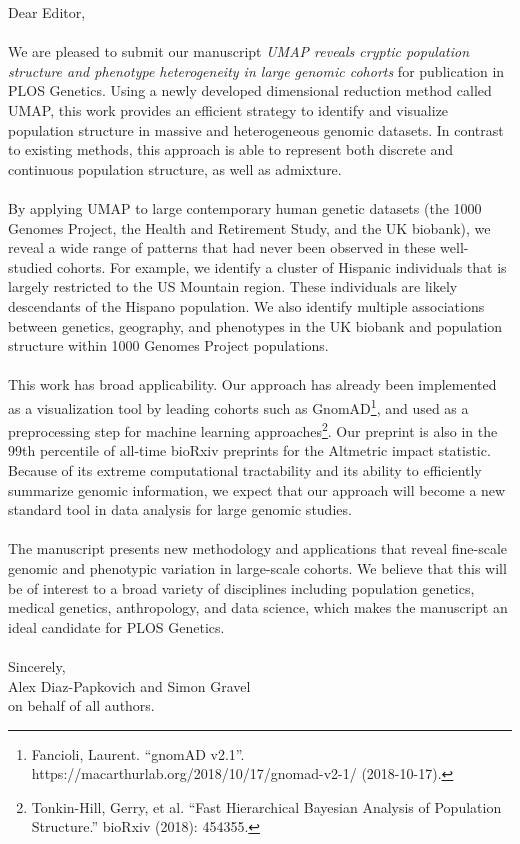 \documentclass{article}
\begin{document}
Dear Editor,
\\\\
We are pleased to submit our manuscript \emph{UMAP reveals cryptic population structure and phenotype heterogeneity in large genomic cohorts} for publication in PLOS Genetics. Using a newly developed dimensional reduction method called UMAP, this work provides an efficient strategy to identify and visualize population structure in massive and heterogeneous genomic datasets. In contrast to existing methods, this approach is able to represent both discrete and continuous population structure, as well as admixture. 
\\\\
By applying UMAP to large contemporary human genetic datasets (the 1000 Genomes Project, the Health and Retirement Study, and the UK biobank), we reveal a wide range of patterns that had never been observed in these well-studied cohorts. For example, we identify a cluster of Hispanic individuals that is largely restricted to the US Mountain region. These individuals are likely descendants of the Hispano population. We also identify multiple associations between genetics, geography, and phenotypes in the UK biobank and population structure within 1000 Genomes Project populations.
\\\\
This work has broad applicability. Our approach has already been implemented as a visualization tool by leading cohorts such as GnomAD\footnote{Fancioli, Laurent. ``gnomAD v2.1''. https://macarthurlab.org/2018/10/17/gnomad-v2-1/ (2018-10-17).}, and used as a preprocessing step for machine learning approaches\footnote{Tonkin-Hill, Gerry, et al. ``Fast Hierarchical Bayesian Analysis of Population Structure.'' bioRxiv (2018): 454355.}. Our preprint is also in the 99th percentile of all-time bioRxiv preprints for the Altmetric impact statistic. Because of its extreme computational tractability and its ability to efficiently summarize genomic information, we expect that our approach will become a new standard tool in data analysis for large genomic studies. 
\\\\
The manuscript presents new methodology and applications that reveal fine-scale genomic and phenotypic variation in large-scale cohorts.  We believe that this will be of interest to a broad variety of disciplines including population genetics, medical genetics, anthropology, and data science, which makes the manuscript an ideal candidate for PLOS Genetics.
\\
\\
Sincerely,
\\
Alex Diaz-Papkovich and Simon Gravel
\\
on behalf of all authors.
\end{document}
